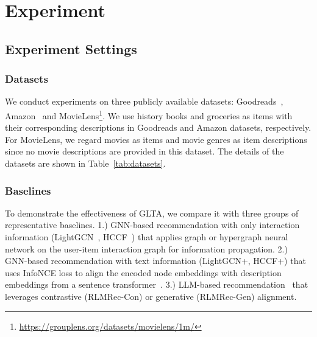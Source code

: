 \section{Experiment}
\subsection{Experiment Settings}
\subsubsection{Datasets}
\begin{table}
  \caption{Statistics of the datasets for GLTA}
  \label{tab:datasets}
\end{table}
We conduct experiments on three publicly available datasets: Goodreads~\cite{dataset:goodreads}, Amazon~\cite{dataset:amazon} and MovieLens\footnote{\url{https://grouplens.org/datasets/movielens/1m/}}.
We use history books and groceries as items with their corresponding descriptions in Goodreads and Amazon datasets, respectively. For MovieLens, we regard movies as items and movie genres as item descriptions since no movie descriptions are provided in this dataset. The details of the datasets are shown in Table~\ref{tab:datasets}.

\subsubsection{Baselines}
To demonstrate the effectiveness of GLTA, we compare it with three groups of representative baselines. 1.) GNN-based recommendation with only interaction information (LightGCN~\cite{LightGCN}, HCCF~\cite{hccf}) that applies graph or hypergraph neural network on the user-item interaction graph for information propagation. 2.) GNN-based recommendation with text information (LightGCN+, HCCF+) that uses InfoNCE loss to align the encoded node embeddings with description embeddings from a sentence transformer~\cite{minilm}. 3.) LLM-based recommendation~\cite{rlmrec} that leverages contrastive (RLMRec-Con) or generative (RLMRec-Gen) alignment. 

